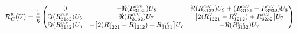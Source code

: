 \documentclass[a4paper,12pt]{article} %
\begin{document}
\begin{small}
\begin{eqnarray*}
\begin{split}
\mathcal{R}^{8}_{C}(U)&= \dfrac{1}{\hbar}
\begin{pmatrix}
0 & -\Re(R^{\textsc{c-v}}_{3132})U_{8} & \Re(R^{\textsc{c-v}}_{3132})U_{9}+(R^{\textsc{c-v}}_{3131}-R^{\textsc{c-v}}_{3232})U_{8}\\
\Im(R^{\textsc{c-v}}_{3132})U_{5} & \Re(R^{\textsc{c-v}}_{3132})U_{7} &  \big[2(R^{\textsc{v}}_{1221}-R^{\textsc{v}}_{1212})+R^{\textsc{c-v}}_{3232}\big]U_{7}\\
\Im(R^{\textsc{c-v}}_{3132})U_{6} & -\big[2(R^{\textsc{v}}_{1221}-R^{\textsc{v}}_{1212})+R^{\textsc{c-v}}_{3131}\big]U_{7} & -\Re(R^{\textsc{c-v}}_{3132})U_{7}
\end{pmatrix}
\end{split}
\end{eqnarray*}
\end{small}





















































\end{document}
